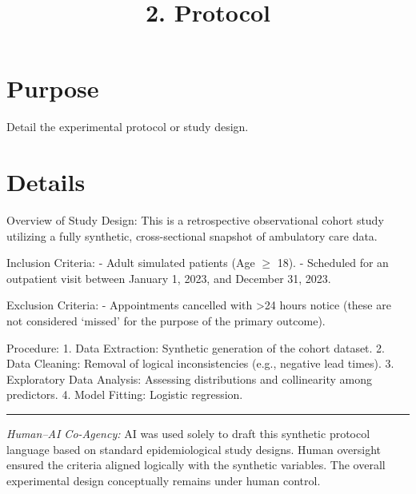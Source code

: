 \documentclass[
]{report}
\title{2. Protocol}
\author{}
\date{}
\renewcommand*\contentsname{Table of contents}
\newcommand\contentsname{Table of contents}
\begin{document}
\maketitle

\renewcommand*\contentsname{Table of contents}
{
\hypersetup{linkcolor=}
\setcounter{tocdepth}{2}
\tableofcontents
}

\chapter{Purpose}\label{purpose}

Detail the experimental protocol or study design.

\chapter{Details}\label{details}

Overview of Study Design: This is a retrospective observational cohort
study utilizing a fully synthetic, cross-sectional snapshot of
ambulatory care data.

Inclusion Criteria: - Adult simulated patients (Age \(\ge\) 18). -
Scheduled for an outpatient visit between January 1, 2023, and December
31, 2023.

Exclusion Criteria: - Appointments cancelled with \textgreater24 hours
notice (these are not considered `missed' for the purpose of the primary
outcome).

Procedure: 1. Data Extraction: Synthetic generation of the cohort
dataset. 2. Data Cleaning: Removal of logical inconsistencies (e.g.,
negative lead times). 3. Exploratory Data Analysis: Assessing
distributions and collinearity among predictors. 4. Model Fitting:
Logistic regression.

\begin{center}\rule{0.5\linewidth}{0.5pt}\end{center}

\begin{tcolorbox}[enhanced jigsaw, left=2mm, opacitybacktitle=0.6, colback=white, titlerule=0mm, coltitle=black, breakable, colbacktitle=quarto-callout-note-color!10!white, arc=.35mm, colframe=quarto-callout-note-color-frame, leftrule=.75mm, bottomtitle=1mm, toptitle=1mm, title=\textcolor{quarto-callout-note-color}{\faInfo}\hspace{0.5em}{AI Capability Checkpoint}, rightrule=.15mm, toprule=.15mm, bottomrule=.15mm, opacityback=0]

\emph{Human--AI Co-Agency:} AI was used solely to draft this synthetic
protocol language based on standard epidemiological study designs. Human
oversight ensured the criteria aligned logically with the synthetic
variables. The overall experimental design conceptually remains under
human control.

\end{tcolorbox}
\end{document}

